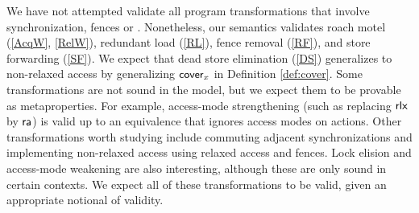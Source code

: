 We have not attempted validate all program transformations that involve
synchronization, fences or \RMWs{}
\cite{DBLP:conf/popl/VafeiadisBCMN15,DBLP:phd/hal/Morisset17}.  Nonetheless,
our semantics validates roach motel (\ref{AcqW}, \ref{RelW}), redundant load
(\ref{RL}), fence removal (\ref{RF}), and store forwarding (\ref{SF}).  We
expect that dead store elimination (\ref{DS}) generalizes to non-relaxed
access by generalizing $\relfilt[]{\aLoc}$ in Definition \ref{def:cover}.
Some transformations are not sound in the model, but we expect them to be
provable as metaproperties.  For example, access-mode strengthening (such as
replacing ${\mathsf{rlx}}$ by ${\mathsf{ra}}$) is valid up to an equivalence that ignores
access modes on actions.  Other transformations worth studying include
commuting adjacent synchronizations and implementing non-relaxed access using
relaxed access and fences.  Lock elision and access-mode weakening are also
interesting, although these are only sound in certain contexts.  We expect
all of these transformations to be valid, given an appropriate notional of
validity.
\begin{comment}
https://preshing.com/20131125/acquire-and-release-fences-dont-work-the-way-youd-expect/

Cannot encode R/A actions with actions+fences...

A release operation prevents preceding memory operations from being delayed
past it (a;Rel =/=> Rel;a)
 
A release fence prevents preceding memory operations from being delayed past
subsequent writes (a;FR;w =/=> w;a;FR)

An acquire operation prevents subsequent memory operations from being advanced
before it (Acq;a =/=> a;Acq)

An acquire fence prevents subsequent memory operations from being advanced
before prior reads (r;FA;a =/=> FA;a;r)

https://www.modernescpp.com/index.php/fences-as-memory-barriers

StoreLoad: Full fence allows a store before to be reordered with respect to a
load after (wx;F;ry) ===> (ry;F;wx)

StoreLoad+LoadLoad: Release fence also allows (rx;FR;ry) ===> (ry;FR;rx)

StoreLoad+StoreStore: Acquire fence also allows (wx;FR;wy) ===> (wy;FR;wx)

LoadStore: No fence allows a prior load to reorder w.r.t. a subsequent store
(rx;FR;wy) =/=> (wy;FR;rx)

https://preshing.com/20120710/memory-barriers-are-like-source-control-operations/
Good news is that a fullFence does it.

Bizarrely, it seems this is not supported in C++... You have to go to assembly.
\end{comment}


